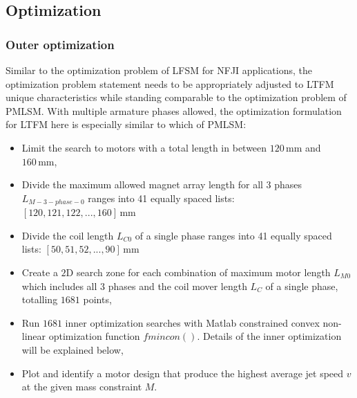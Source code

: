         
        
        \subsection{Optimization}                   \label{Chapter:RSM/LTFM/Optimization}
        
        
            \subsubsection{Outer optimization}         \label{Chapter:RSM/LTFM/Optimization/Outer}
    
            
                Similar to the optimization problem of \acs{LFSM} for \acs{NFJI} applications, the optimization problem statement needs to be appropriately adjusted to \acs{LTFM} unique characteristics while standing comparable to the optimization problem of \acs{PMLSM}. With multiple armature phases allowed, the optimization formulation for \acs{LTFM} here is especially similar to which of \acs{PMLSM}:
                
                
                \begin{itemize}
                    \item   Limit the search to motors with a total length in between $120\,\mathrm{mm}$ and $160\,\mathrm{mm}$,
                    \item   Divide the maximum allowed magnet array length for all 3 phases $L_{M-3-phase-0}$ ranges into 41 equally spaced lists: \\ $[120, 121, 122, ..., 160]\,\mathrm{mm}$ 
                    \item   Divide the coil length $L_{C0}$ of a single phase ranges into 41 equally spaced lists:  $[50, 51, 52, ..., 90]\,\mathrm{mm}$ 
                    \item   Create a $\mathrm{2D}$ search zone for each combination of maximum motor length $L_{M0}$ which includes all 3 phases and the coil mover length $L_{C}$ of a single phase, totalling $1681$ points,
                    \item   Run $1681$ inner optimization searches with Matlab constrained convex non-linear optimization function $fmincon()$. Details of the inner optimization will be explained below,
                    \item   Plot and identify a motor design that produce the highest average jet speed $v$ at the given mass constraint $M$.
                \end{itemize}
                
